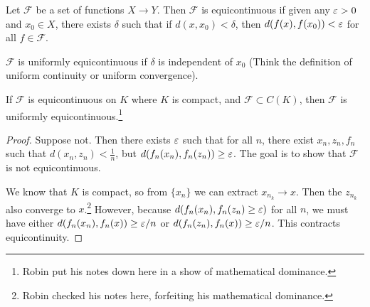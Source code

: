 \documentclass[10pt, twoside]{article}
\begin{document}
    \begin{defn}[Equicontinuity]
        Let $\mathcal{F}$ be a set of functions $X \rightarrow Y$. Then $\mathcal{F}$ is equicontinuous if given any $\varepsilon > 0$ and $x_0 \in X$, there exists $\delta$ such that if $d(x,x_0) < \delta$, then $d(f(x), f(x_0)) < \varepsilon$ for all $f \in \mathcal{F}$.
    \end{defn}

    \begin{defn}
        $\mathcal{F}$ is uniformly equicontinuous if $\delta$ is independent of $x_0$ (Think the definition of uniform continuity or uniform convergence).
    \end{defn}

    \begin{thm}
        If $\mathcal{F}$ is equicontinuous on $K$ where $K$ is compact, and $\mathcal{F} \subset C(K)$, then $\mathcal{F}$ is uniformly equicontinuous.\footnote{Robin put his notes down here in a show of mathematical dominance.}
        \begin{proof}
            Suppose not. Then there exists $\varepsilon$ such that for all $n$, there exist $x_n,z_n,f_n$ such that $d(x_n,z_n) < \frac{1}{n}$, but $d(f_n(x_n), f_n(z_n)) \geq \varepsilon$. The goal is to show that $\mathcal{F}$ is not equicontinuous. 
            
            We know that $K$ is compact, so from $\{x_n\}$ we can extract $x_{n_k} \rightarrow x$. Then the $z_{n_k}$ also converge to $x$.\footnote{Robin checked his notes here, forfeiting his mathematical dominance.} However, because $d(f_n(x_n), f_n(z_n) \geq \varepsilon)$ for all $n$, we must have either $d(f_n(x_n), f_n(x)) \geq \varepsilon / n$ or $d(f_n(z_n), f_n(x)) \geq \varepsilon / n$. This contracts equicontinuity.
        \end{proof}
    \end{thm}
\end{document}
